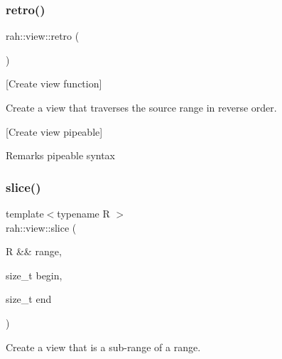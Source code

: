 \subsubsection{\texorpdfstring{retro()}{retro()}\hspace{0.1cm}{\footnotesize\ttfamily [2/2]}}
{\footnotesize\ttfamily rah\+::view\+::retro (\begin{DoxyParamCaption}{ }\end{DoxyParamCaption})}



\mbox{[}Create view function\mbox{]} 

Create a view that traverses the source range in reverse order.

\mbox{[}Create view pipeable\mbox{]}

\begin{DoxyRemark}{Remarks}
pipeable syntax
\end{DoxyRemark}

\begin{DoxyCodeInclude}{0}
\end{DoxyCodeInclude}
\mbox{\label{namespacerah_1_1view_a4e7a243408052f64886e6349650df16c}} 
\subsubsection{\texorpdfstring{slice()}{slice()}\hspace{0.1cm}{\footnotesize\ttfamily [1/2]}}
{\footnotesize\ttfamily template$<$typename R $>$ \\
rah\+::view\+::slice (\begin{DoxyParamCaption}\item[{R \&\&}]{range,  }\item[{size\+\_\+t}]{begin,  }\item[{size\+\_\+t}]{end }\end{DoxyParamCaption})}



Create a view that is a sub-\/range of a range. 



